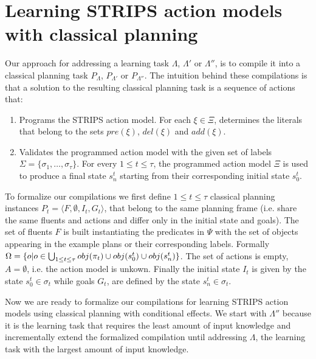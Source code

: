 \documentclass[letterpaper]{article} %
\newcommand{\tup}[1]{{\langle #1 \rangle}}
\begin{document}
\section{Learning STRIPS action models with classical planning}
Our approach for addressing a learning task $\Lambda$, $\Lambda'$ or $\Lambda''$, is to compile it into a classical planning task $P_{\Lambda}$, $P_{\Lambda'}$ or $P_{\Lambda''}$. The intuition behind these compilations is that a solution to the resulting classical planning task is a sequence of actions that:
\begin{enumerate}
\item Programs the STRIPS action model. For each $\xi\in\Xi$, determines the literals that belong to the sets $pre(\xi)$, $del(\xi)$ and $add(\xi)$.
\item Validates the programmed action model with the given set of labels $\Sigma=\{\sigma_1,\ldots,\sigma_{\tau}\}$. For every {\small $1\leq t\leq \tau$}, the programmed action model $\Xi$ is used to produce a final state $s_{n}^t$ starting from their corresponding initial state $s_0^t$.
\end{enumerate}

To formalize our compilations we first define {\small $1\leq t\leq \tau$} classical planning instances $P_t=\tup{F,\emptyset,I_t,G_t}$, that belong to the same planning frame (i.e. share the same fluents and actions and differ only in the initial state and goals). The set of fluents $F$ is built instantiating the predicates in $\Psi$ with the set of objects appearing in the example plans or their corresponding labels. Formally $\Omega=\{o|o\in \bigcup_{\small 1\leq t\leq \tau} obj(\pi_t)\cup obj(s_0^t)\cup obj(s_n^t)\}$. The set of actions is empty, $A=\emptyset$, i.e. the action model is unkown. Finally the initial state $I_t$ is given by the state $s_0^t\in \sigma_t$ while goals $G_t$, are defined by the state $s_n^t\in \sigma_t$. 

Now we are ready to formalize our compilations for learning STRIPS action models using classical planning with conditional effects. We start with $\Lambda''$ because it is the learning task that requires the least amount of input knowledge and incrementally extend the formalized compilation until addressing $\Lambda$, the learning task with the largest amount of input knowledge.
\end{document}
